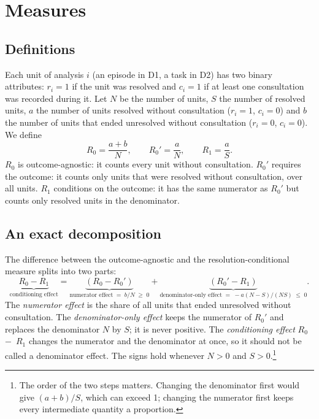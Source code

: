 \documentclass[pdflatex,sn-basic]{sn-jnl}
\newcommand{\Rz}{\ensuremath{R_0}}
\newcommand{\Rzp}{\ensuremath{R_0'}}
\newcommand{\Ro}{\ensuremath{R_1}}
\begin{document}
\section{Measures}\label{sec:measures}

\subsection{Definitions}

Each unit of analysis $i$ (an episode in D1, a task in D2) has two binary attributes: $r_i = 1$ if the unit was resolved and $c_i = 1$ if at least one consultation was recorded during it. Let $N$ be the number of units, $S$ the number of resolved units, $a$ the number of units resolved without consultation ($r_i = 1$, $c_i = 0$) and $b$ the number of units that ended unresolved without consultation ($r_i = 0$, $c_i = 0$). We define
\begin{equation}
\Rz = \frac{a+b}{N}, \qquad \Rzp = \frac{a}{N}, \qquad \Ro = \frac{a}{S}.
\end{equation}
\Rz{} is outcome-agnostic: it counts every unit without consultation. \Rzp{} requires the outcome: it counts only units that were resolved without consultation, over all units. \Ro{} conditions on the outcome: it has the same numerator as \Rzp{} but counts only resolved units in the denominator.

\subsection{An exact decomposition}

The difference between the outcome-agnostic and the resolution-conditional measure splits into two parts:
\begin{equation}\label{eq:decomp}
\underbrace{\Rz - \Ro}_{\text{conditioning effect}}
= \underbrace{(\Rz - \Rzp)}_{\text{numerator effect}\;=\;b/N\;\ge\;0}
+ \underbrace{(\Rzp - \Ro)}_{\text{denominator-only effect}\;=\;-a(N-S)/(NS)\;\le\;0}.
\end{equation}
The \emph{numerator effect} is the share of all units that ended unresolved without consultation. The \emph{denominator-only effect} keeps the numerator of \Rzp{} and replaces the denominator $N$ by $S$; it is never positive. The \emph{conditioning effect} \Rz{}~$-$~\Ro{} changes the numerator and the denominator at once, so it should not be called a denominator effect. The signs hold whenever $N > 0$ and $S > 0$.\footnote{The order of the two steps matters. Changing the denominator first would give $(a+b)/S$, which can exceed 1; changing the numerator first keeps every intermediate quantity a proportion.}
\end{document}
